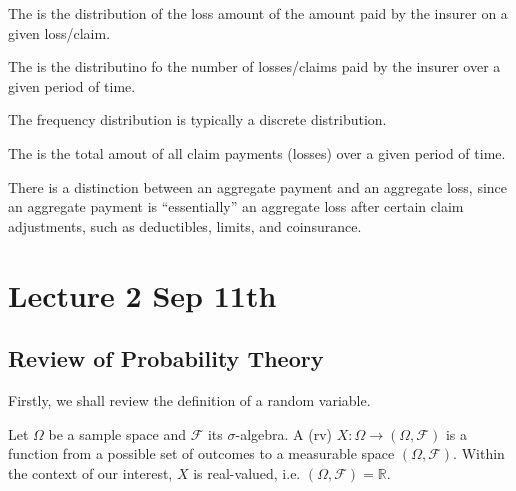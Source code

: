 \documentclass[notoc,notitlepage]{tufte-book}
\begin{document}
\begin{defn}
\label{defn:severity_distribution}
  The  is the distribution of the loss amount of the amount paid by the insurer on a given loss/claim.
\end{defn}

\begin{defn}
\label{defn:frequency_distribution}
  The  is the distributino fo the number of losses/claims paid by the insurer over a given period of time.
\end{defn}

\begin{note}
  The frequency distribution is typically a discrete distribution.
\end{note}

\begin{defn}
\label{defn:aggrement_payment_loss}
  The  is the total amout of all claim payments (losses) over a given period of time.
\end{defn}

\begin{note}
  There is a distinction between an aggregate payment and an aggregate loss, since an aggregate payment is ``essentially'' an aggregate loss after certain claim adjustments, such as deductibles, limits, and coinsurance.
\end{note}



\chapter{Lecture 2 Sep 11th}%
\label{chp:lecture_2_sep_11th}

\section{Review of Probability Theory}%
\label{sec:review_of_probability_theory}

Firstly, we shall review the definition of a random variable.

\begin{defn}
\label{defn:random_variable}
  Let $\Omega$ be a sample space and $\mathcal{F}$ its $\sigma$-algebra. A  (rv) $X : \Omega \to (\Omega, \mathcal{F})$ is a function from a possible set of outcomes to a measurable space $(\Omega, \mathcal{F})$. Within the context of our interest, $X$ is real-valued, i.e. $(\Omega, \mathcal{F}) = \mathbb{R}$.
\end{defn}
\end{document}
